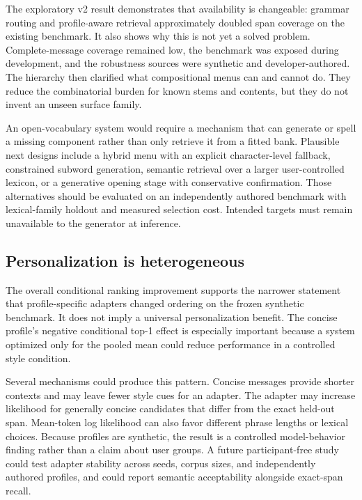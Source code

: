 \documentclass[11pt]{article}
\begin{document}
The exploratory v2 result demonstrates that availability is changeable: grammar routing and profile-aware retrieval approximately doubled span coverage on the existing benchmark. It also shows why this is not yet a solved problem. Complete-message coverage remained low, the benchmark was exposed during development, and the robustness sources were synthetic and developer-authored. The hierarchy then clarified what compositional menus can and cannot do. They reduce the combinatorial burden for known stems and contents, but they do not invent an unseen surface family.


An open-vocabulary system would require a mechanism that can generate or spell a missing component rather than only retrieve it from a fitted bank. Plausible next designs include a hybrid menu with an explicit character-level fallback, constrained subword generation, semantic retrieval over a larger user-controlled lexicon, or a generative opening stage with conservative confirmation. Those alternatives should be evaluated on an independently authored benchmark with lexical-family holdout and measured selection cost. Intended targets must remain unavailable to the generator at inference.


\subsection{Personalization is heterogeneous}

The overall conditional ranking improvement supports the narrower statement that profile-specific adapters changed ordering on the frozen synthetic benchmark. It does not imply a universal personalization benefit. The concise profile's negative conditional top-1 effect is especially important because a system optimized only for the pooled mean could reduce performance in a controlled style condition.


Several mechanisms could produce this pattern. Concise messages provide shorter contexts and may leave fewer style cues for an adapter. The adapter may increase likelihood for generally concise candidates that differ from the exact held-out span. Mean-token log likelihood can also favor different phrase lengths or lexical choices. Because profiles are synthetic, the result is a controlled model-behavior finding rather than a claim about user groups. A future participant-free study could test adapter stability across seeds, corpus sizes, and independently authored profiles, and could report semantic acceptability alongside exact-span recall.
\end{document}
